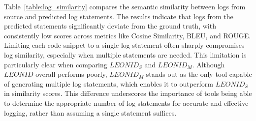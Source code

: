 Table~\ref{table:log_similarity} compares the semantic similarity between logs from source and predicted log statements.
The results indicate that logs from the predicted statements significantly deviate from the ground truth, with consistently low scores across metrics like Cosine Similarity, BLEU, and ROUGE.
 Limiting each code snippet to a single log statement often sharply compromises log similarity, especially when multiple statements are needed. This limitation is particularly clear when comparing \(LEONID_S\) and \(LEONID_M\). Although \(LEONID\) overall performs poorly, \(LEONID_M\) stands out as the only tool capable of generating multiple log statements, which enables it to outperform \(LEONID_S\) in similarity scores. This difference underscores the importance of tools being able to determine the appropriate number of log statements for accurate and effective logging, rather than assuming a single statement suffices.


